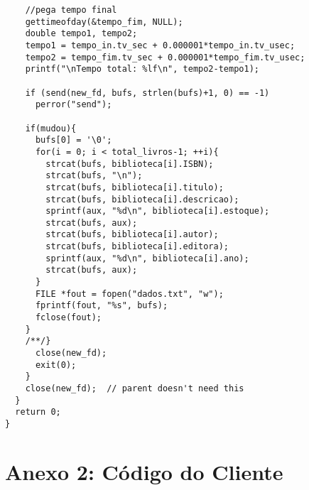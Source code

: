 \documentclass[11pt, brazil]{article} %
\begin{document}
\begin{verbatim}
	//pega tempo final
	gettimeofday(&tempo_fim, NULL);
	double tempo1, tempo2;
	tempo1 = tempo_in.tv_sec + 0.000001*tempo_in.tv_usec;
	tempo2 = tempo_fim.tv_sec + 0.000001*tempo_fim.tv_usec;
	printf("\nTempo total: %lf\n", tempo2-tempo1);
							
	if (send(new_fd, bufs, strlen(bufs)+1, 0) == -1)
	  perror("send");
				
	if(mudou){
	  bufs[0] = '\0';
	  for(i = 0; i < total_livros-1; ++i){
	    strcat(bufs, biblioteca[i].ISBN);
	    strcat(bufs, "\n");
	    strcat(bufs, biblioteca[i].titulo);
	    strcat(bufs, biblioteca[i].descricao);
	    sprintf(aux, "%d\n", biblioteca[i].estoque);
	    strcat(bufs, aux);
	    strcat(bufs, biblioteca[i].autor);
	    strcat(bufs, biblioteca[i].editora);
	    sprintf(aux, "%d\n", biblioteca[i].ano);
	    strcat(bufs, aux);			
	  }
	  FILE *fout = fopen("dados.txt", "w");
	  fprintf(fout, "%s", bufs);
	  fclose(fout);
	}
	/**/}	
      close(new_fd);
      exit(0);
    }
    close(new_fd);  // parent doesn't need this
  }
  return 0;
}
\end{verbatim}


\section*{Anexo 2: Código do Cliente}
\end{document}

